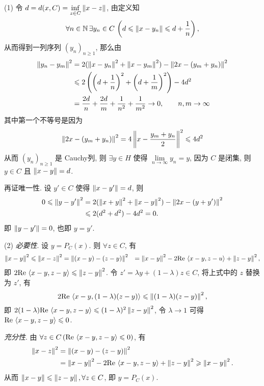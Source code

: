 	\begin{Proof}
		(1) 令 $ d=d(x, C)=\inf\limits_{z\in C}\left\| x-z \right\| $, 由定义知
		\[
			\forall n\in\mathbb{N}\,\exists y_{n}\in C\,\left(d\leqslant\left\| x-y_{n} \right\|\leqslant d+\frac{1}{n}\right),
		\]
		从而得到一列序列 $ (y_{n})_{n\geqslant1} $, 那么由
		\[
			\begin{aligned}
				\left\| y_{n}-y_{m} \right\|^{2} & =2(\left\| x-y_{n} \right\|^{2}+\left\| x-y_{m} \right\|^{2})-\left\| 2x-(y_{m}+y_{n}) \right\|^{2}\\
				& \leqslant 2\left( \left( d+\frac{1}{n} \right)^{2}+\left( d+\frac{1}{m} \right)^{2} \right)-4d^{2}\\
				& =\frac{2d}{n}+\frac{2d}{m}+\frac{1}{n^{2}}+\frac{1}{m^{2}}\to 0,\qquad n,m\to \infty
			\end{aligned}
		\]
		其中第一个不等号是因为
		\[
			\left\| 2x-(y_{m}+y_{n}) \right\|^{2}=4\left\| x-\frac{y_{m}+y_{n}}{2} \right\|^{2}\leqslant4d^{2}
		\]
		从而 $ (y_{n})_{n\geqslant1} $ 是 Cauchy列, 则 $ \exists y\in H $ 使得 $ \lim\limits_{n\to\infty}y_{n}=y $, 因为 $ C $ 是闭集, 则 $ y\in C $ 且 $ \left\| x-y \right\|=d $.

		再证唯一性. 设 $ y'\in C $ 使得 $ \left\| x-y' \right\|=d $, 则
		\[
			\begin{aligned}
				0\leqslant\left\| y-y' \right\|^{2} & =2(\left\| x+y \right\|^{2}+\left\| x-y \right\|^{2})-\left\| 2x-(y+y') \right\|^{2}\\
				 & \leqslant 2(d^{2}+d^{2})-4d^{2}=0.
			\end{aligned}
		\]
		即 $ \left\| y-y' \right\|=0 $, 也即 $ y=y' $.

		(2) \textsl{必要性}. 设 $ y=P_{C}(x) $. 则 $ \forall z\in C $, 有
		\[
			\begin{aligned}
				\left\| x-y \right\|^{2}\leqslant\left\| x-z \right\|^{2} & = \left\| (x-y)-(z-y) \right\|^{2}
				 & =\left\| x-y \right\|^{2}-2\mathrm{Re\,}\left\langle x-y, z-u \right\rangle+\left\| z-y \right\|^{2},
			\end{aligned}
		\]
		即 $ 2\mathrm{Re\,}\left\langle x-y, z-y \right\rangle\leqslant\left\| z-y \right\|^{2} $. 令 $ z'=\lambda y+(1-\lambda)z\in C $, 将上式中的 $ z $ 替换为 $ z' $, 有
		\[
			2\mathrm{Re\,}\left\langle x-y, (1-\lambda)(z-y) \right\rangle\leqslant\left\| (1-\lambda)(z-y) \right\|^{2},
		\]
		即 $ 2(1-\lambda)\mathrm{Re\,}\left\langle x-y, z-y \right\rangle\leqslant(1-\lambda)^2\left\| z-y \right\|^{2} $, 令 $ \lambda\to 1 $ 可得 $ \mathrm{Re\,}\left\langle x-y, z-y \right\rangle\leqslant0 $.
		
		\textsl{充分性}. 由 $ \forall z\in C\,(\mathrm{Re\,}\left\langle x-y, z-y \right\rangle\leqslant0) $, 有
		\[
			\begin{aligned}
				\left\| x-z \right\|^{2} & = \left\| (x-y)-(z-y) \right\|^{2}\\
				& =\left\| x-y \right\|^{2}-2\mathrm{Re\,}\left\langle x-y, z-y \right\rangle+\left\| z-y \right\|^{2}\geqslant\left\| x-y \right\|^{2}.
			\end{aligned}
		\]
		从而 $ \left\| x-y \right\|\leqslant\left\| z-y \right\|, \forall z\in C $, 即 $ y=P_{C}(x) $.


\end{Proof}

